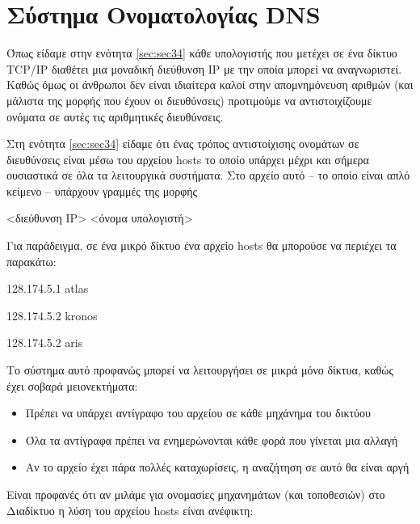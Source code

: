 %
%
\section{Σύστημα Ονοματολογίας DNS}
\label{sec:sec61}

Όπως είδαμε στην ενότητα \ref{sec:sec34} κάθε υπολογιστής που μετέχει σε ένα δίκτυο TCP/IP διαθέτει μια μοναδική διεύθυνση IP με την οποία μπορεί να αναγνωριστεί. Καθώς όμως οι άνθρωποι δεν είναι ιδιαίτερα καλοί στην απομνημόνευση αριθμών (και μάλιστα της μορφής που έχουν οι διευθύνσεις) προτιμούμε να αντιστοιχίζουμε ονόματα σε αυτές τις αριθμητικές διευθύνσεις. 

Στη ενότητα \ref{sec:sec34} είδαμε ότι ένας τρόπος αντιστοίχισης ονομάτων σε διευθύνσεις είναι μέσω του αρχείου hosts το οποίο υπάρχει μέχρι και σήμερα ουσιαστικά σε όλα τα λειτουργικά συστήματα. Στο αρχείο αυτό -- το οποίο είναι απλό κείμενο -- υπάρχουν γραμμές της μορφής 

\begin{center}
<διεύθυνση IP> \hspace{20mm} <όνομα υπολογιστή>
\end{center}

Για παράδειγμα, σε ένα μικρό δίκτυο ένα αρχείο hosts θα μπορούσε να περιέχει τα παρακάτω:

\ttfamily
\hspace{30mm}128.174.5.1 \hspace{20mm} atlas

\hspace{30mm}128.174.5.2 \hspace{20mm} kronos

\hspace{30mm}128.174.5.2 \hspace{20mm} aris
\normalfont

Το σύστημα αυτό προφανώς μπορεί να λειτουργήσει σε μικρά μόνο δίκτυα, καθώς έχει σοβαρά μειονεκτήματα:

\begin{itemize}
\item Πρέπει να υπάρχει αντίγραφο του αρχείου σε κάθε μηχάνημα του δικτύου
\item Όλα τα αντίγραφα πρέπει να ενημερώνονται κάθε φορά που γίνεται μια αλλαγή
\item Αν το αρχείο έχει πάρα πολλές καταχωρίσεις, η αναζήτηση σε αυτό θα είναι αργή
\end{itemize}

Είναι προφανές ότι αν μιλάμε για ονομασίες μηχανημάτων (και τοποθεσιών) στο Διαδίκτυο η λύση του αρχείου hosts είναι ανέφικτη:


